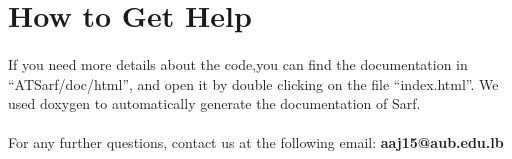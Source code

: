 \documentclass{article}
\begin{document}



\section{How to Get Help}
\paragraph{}
If you need more details about the code,you can find the documentation in ``ATSarf/doc/html'', and open it by double clicking on the file ``index.html''. We used doxygen to automatically generate the documentation of Sarf.

\paragraph{}
For any further questions, contact us at the following email: \textbf{aaj15@aub.edu.lb}
\end{document}
